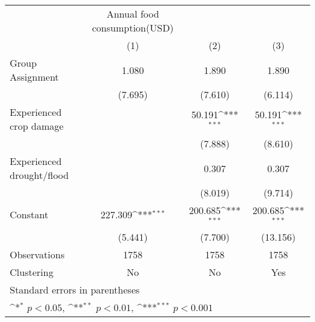 {
\def\sym#1{\ifmmode^{#1}\else\(^{#1}\)\fi}
\begin{tabular}{l*{3}{c}}
\hline\hline
                    &Annual food consumption(USD)                                     \\
                    &\multicolumn{1}{c}{(1)}         &\multicolumn{1}{c}{(2)}         &\multicolumn{1}{c}{(3)}         \\
\hline
Group Assignment    &       1.080         &       1.890         &       1.890         \\
                    &     (7.695)         &     (7.610)         &     (6.114)         \\
[1em]
Experienced crop damage&                     &      50.191\sym{***}&      50.191\sym{***}\\
                    &                     &     (7.888)         &     (8.610)         \\
[1em]
Experienced drought/flood&                     &       0.307         &       0.307         \\
                    &                     &     (8.019)         &     (9.714)         \\
[1em]
Constant            &     227.309\sym{***}&     200.685\sym{***}&     200.685\sym{***}\\
                    &     (5.441)         &     (7.700)         &    (13.156)         \\
\hline
Observations        &        1758         &        1758         &        1758         \\
Clustering          &          No         &          No         &         Yes         \\
\hline\hline
\multicolumn{4}{l}{\footnotesize Standard errors in parentheses}\\
\multicolumn{4}{l}{\footnotesize \sym{*} \(p<0.05\), \sym{**} \(p<0.01\), \sym{***} \(p<0.001\)}\\
\end{tabular}
}
